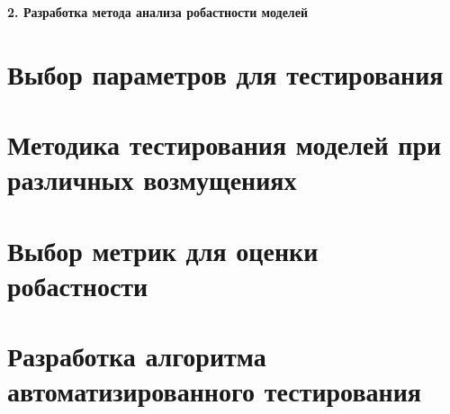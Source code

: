 \newpage
\begin{center}
  \textbf{\large 2. Разработка метода анализа робастности моделей}
\end{center}

\section{Выбор параметров для тестирования}
\section{Методика тестирования моделей при различных возмущениях}
\section{Выбор метрик для оценки робастности}
\section{Разработка алгоритма автоматизированного тестирования}